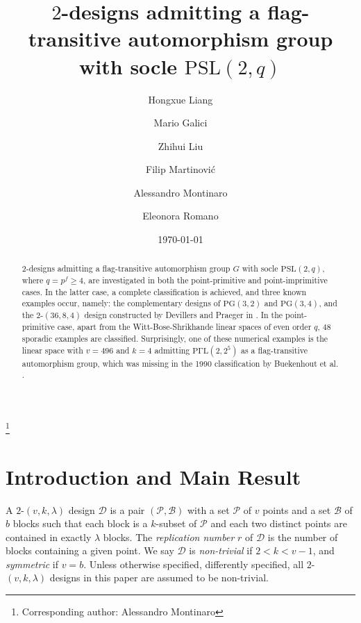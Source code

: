 \documentclass[a4paper,twopage,reqno,12pt]{amsart}
\theoremstyle{definition}
\numberwithin{equation}{section}
\newcommand{\PSL}{\mathrm{PSL}}
\newcommand{\PGaL}{\mathrm{P\Gamma L}}
\newcommand{\PG}{\mathrm{PG}}
\newcommand{\Dmc}{\mathcal{D}}%
\renewcommand{\geq}{\geqslant}
\begin{document}
\title[Flag-transitive $2$-designs] {$2$-designs admitting a flag-transitive automorphism group with socle $\PSL(2,q)$}
\author[Liang]{Hongxue Liang}
\address{School of Mathematics, Foshan University, Foshan 528000, P.R. China}
\author[Galici]{Mario Galici}
\address{Dipartimento di Matematica e Fisica “E. De Giorgi”, University of Salento, Lecce, Italy}
\author[Liu]{Zhihui Liu}
\address{School of Mathematics, Foshan University, Foshan 528000, P.R. China}
\author[Martinovi\'{c}]{Filip Martinovi\'{c}}
\address{University of Zagreb, Faculty of Electrical Engineering and Computing}
\author[Montinaro]{Alessandro Montinaro}
\thanks{Corresponding author: Alessandro Montinaro}
\address{Dipartimento di Matematica e Fisica “E. De Giorgi”, University of Salento, Lecce, Italy}
\author[Romano]{Eleonora Romano}
\address{Dipartimento di Matematica e Fisica “E. De Giorgi”, University of Salento, Lecce, Italy}
\date{\today }



\begin{abstract}
$2$-designs admitting a flag-transitive automorphism group $G$ with socle $\PSL(2,q)$, where $q=p^{f}\geq 4$, are investigated in both the point-primitive and point-imprimitive cases. In the latter case, a complete classification is achieved, and three known examples occur, namely: the complementary designs of $\PG(3,2)$ and $\PG(3,4)$, and the $2$-$(36,8,4)$ design constructed by Devillers and Praeger in \cite{DP}. In the point-primitive case, apart from the Witt-Bose-Shrikhande linear spaces of even order $q$, $48$ sporadic examples are classified. Surprisingly, one of these numerical examples is the linear space with $v=496$ and $k=4$ admitting $\PGaL(2,2^{5})$ as a flag-transitive automorphism group, which was missing in the 1990 classification by Buekenhout et al. \cite{BDDKLS,Saxl,De}.
\end{abstract}

\maketitle

\section{Introduction and Main Result } \label{Intro}
A $2$-$(v,k,\lambda )$ design $\Dmc$ is a pair $(\mathcal{P},%
\mathcal{B})$ with a set $\mathcal{P}$ of $v$ points and a set $\mathcal{B}$
of $b$ blocks such that each block is a $k$-subset of $\mathcal{P}$ and each two distinct points are contained in exactly $\lambda $ blocks. The \emph{replication number} $r$ of $\mathcal{D}$ is the number of blocks containing a given point.
We say $\mathcal{D}$ is \emph{non-trivial} if $2<k<v-1$, and \emph{symmetric} if $v=b$. Unless otherwise specified, differently specified, all $2$-$(v,k,\lambda
)$ designs in this paper are assumed to be non-trivial.
\end{document}
